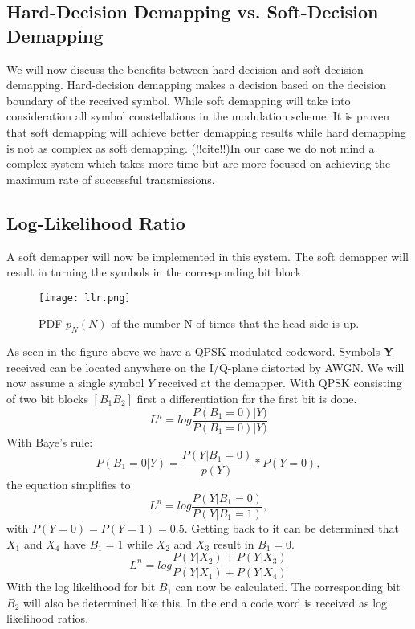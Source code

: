 \subsection{Hard-Decision Demapping vs. Soft-Decision Demapping}
We will now discuss the benefits between hard-decision and soft-decision demapping. Hard-decision demapping makes a decision based on the decision boundary of the received symbol. While soft demapping will take into consideration all symbol constellations in the modulation scheme.
It is proven that soft demapping will achieve better demapping results while hard demapping is not as complex as soft demapping. (!!cite!!)In our case we do not mind a complex system which takes more time but are more focused on achieving the maximum rate of successful transmissions.
\newpage
\subsection{Log-Likelihood Ratio}
A soft demapper will now be implemented in this system. The soft demapper will result in turning the symbols in the corresponding bit block.
\begin{figure}[!htb]
    \centering
    \texttt{[image: llr.png]}
    \caption{PDF $p_N(N)$ of the number N of times that the head side is up.}
    \label{fig:llr}
\end{figure}
\newline
As seen in the figure above we have a \gls{QPSK} modulated codeword. Symbols \textbf{\underline{Y}} received can be located anywhere on the I/Q-plane distorted by AWGN. We will now assume a single symbol $Y$ received at the demapper.
With QPSK consisting of two bit blocks $[B_1B_2]$ first a differentiation for the first bit is done.
\begin{equation}
\label{eq:llr1}
L^n = log\frac{P(B_1=0)|Y)}{P(B_1=0)|Y)}
\end{equation}
With Baye's rule:
\begin{equation}
\label{eq:bl}
P(B_1=0|Y) = \frac{P(Y|B_1=0)}{p(Y)}*P(Y=0),
\end{equation}
the equation simplifies to 
\begin{equation}
L^n = log\frac{P(Y|B_1=0)}{P(Y|B_1=1)},
\end{equation}
with $P(Y=0)=P(Y=1)=0.5$.
Getting back to  it can be determined that $X_1$ and $X_4$ have $B_1=1$ while $X_2$ and $X_3$ result in $B_1=0$.
\begin{equation}
L^n = log\frac{P(Y|X_2)+P(Y|X_3)}{P(Y|X_1)+P(Y|X_4)}
\end{equation}
With  the log likelihood for bit $B_1$ can now be calculated. The corresponding bit $B_2$ will also be determined like this. In the end a code word is received as log likelihood ratios.
